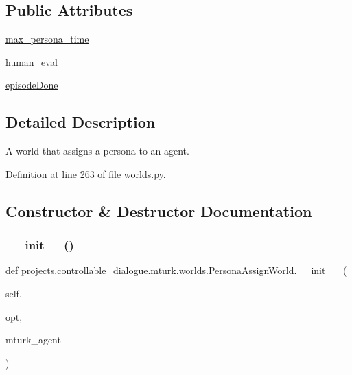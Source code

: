\subsection*{Public Attributes}
\begin{DoxyCompactItemize}
\item 
\hyperlink{classprojects_1_1controllable__dialogue_1_1mturk_1_1worlds_1_1PersonaAssignWorld_a875349c4ad910d85489934e5cc3f4286}{max\+\_\+persona\+\_\+time}
\item 
\hyperlink{classprojects_1_1controllable__dialogue_1_1mturk_1_1worlds_1_1PersonaAssignWorld_abe2ba6a74f6a5c747cffcd62a0db5cb2}{human\+\_\+eval}
\item 
\hyperlink{classprojects_1_1controllable__dialogue_1_1mturk_1_1worlds_1_1PersonaAssignWorld_a4820af5d7a4d448167b669d2b9a1a0ac}{episode\+Done}
\end{DoxyCompactItemize}


\subsection{Detailed Description}
\begin{DoxyVerb}A world that assigns a persona to an agent.
\end{DoxyVerb}
 

Definition at line 263 of file worlds.\+py.



\subsection{Constructor \& Destructor Documentation}
\mbox{\label{classprojects_1_1controllable__dialogue_1_1mturk_1_1worlds_1_1PersonaAssignWorld_a5a4e7ec8f20094ed50f4301233be7ae4}} 
\subsubsection{\texorpdfstring{\+\_\+\+\_\+init\+\_\+\+\_\+()}{\_\_init\_\_()}}
{\footnotesize\ttfamily def projects.\+controllable\+\_\+dialogue.\+mturk.\+worlds.\+Persona\+Assign\+World.\+\_\+\+\_\+init\+\_\+\+\_\+ (\begin{DoxyParamCaption}\item[{}]{self,  }\item[{}]{opt,  }\item[{}]{mturk\+\_\+agent }\end{DoxyParamCaption})}



